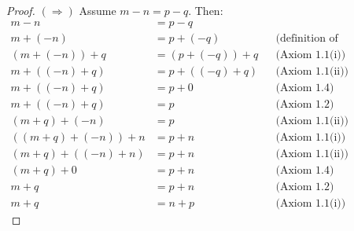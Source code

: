 \begin{enumerate}[label=(\roman*)]
\begin{proof}
              $(\Rightarrow)$ Assume $m-n=p-q$. Then:
              \begin{align*}
                  m-n            & = p-q        &  & \tag{assumption}                   \\
                  m+(-n)         & = p+(-q)     &  & \text{(definition of subtraction)} \\
                  (m+(-n))+q     & = (p+(-q))+q &  & \text{(Axiom 1.1(i))}              \\
                  m+((-n)+q)     & = p+((-q)+q) &  & \text{(Axiom 1.1(ii))}             \\
                  m+((-n)+q)     & = p+0        &  & \text{(Axiom 1.4)}                 \\
                  m+((-n)+q)     & = p          &  & \text{(Axiom 1.2)}                 \\
                  (m+q)+(-n)     & = p          &  & \text{(Axiom 1.1(ii))}             \\
                  ((m+q)+(-n))+n & = p+n        &  & \text{(Axiom 1.1(i))}              \\
                  (m+q)+((-n)+n) & = p+n        &  & \text{(Axiom 1.1(ii))}             \\
                  (m+q)+0        & = p+n        &  & \text{(Axiom 1.4)}                 \\
                  m+q            & = p+n        &  & \text{(Axiom 1.2)}                 \\
                  m+q            & = n+p        &  & \text{(Axiom 1.1(i))}
              \end{align*}


\end{proof}
\end{enumerate}
